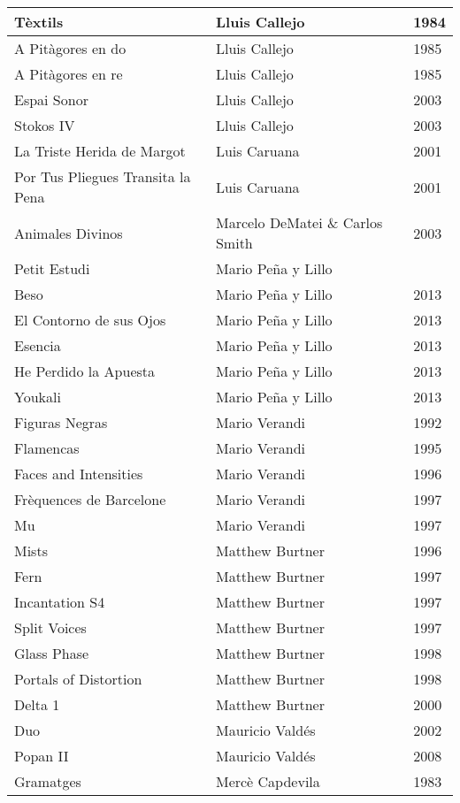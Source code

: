 \begin{center}
\begin{longtable}{ p{}  p{}  p{} }
Tèxtils & Lluis Callejo & 1984 \\ \midrule 
A Pitàgores en do & Lluis Callejo & 1985 \\ \midrule 
A Pitàgores en re & Lluis Callejo & 1985 \\ \midrule 
Espai Sonor & Lluis Callejo & 2003 \\ \midrule 
Stokos IV & Lluis Callejo & 2003 \\ \midrule 
La Triste Herida de Margot & Luis Caruana & 2001 \\ \midrule 
Por Tus Pliegues Transita la Pena & Luis Caruana & 2001 \\ \midrule 
Animales Divinos & Marcelo DeMatei \& Carlos Smith & 2003 \\ \midrule 
Petit Estudi & Mario Peña y Lillo &  \\ \midrule 
Beso & Mario Peña y Lillo & 2013 \\ \midrule 
El Contorno de sus Ojos & Mario Peña y Lillo & 2013 \\ \midrule 
Esencia & Mario Peña y Lillo & 2013 \\ \midrule 
He Perdido la Apuesta & Mario Peña y Lillo & 2013 \\ \midrule 
Youkali & Mario Peña y Lillo & 2013 \\ \midrule 
Figuras Negras & Mario Verandi & 1992 \\ \midrule 
Flamencas & Mario Verandi & 1995 \\ \midrule 
Faces and Intensities & Mario Verandi & 1996 \\ \midrule 
Frèquences de Barcelone & Mario Verandi & 1997 \\ \midrule 
Mu & Mario Verandi & 1997 \\ \midrule 
Mists & Matthew Burtner & 1996 \\ \midrule 
Fern & Matthew Burtner & 1997 \\ \midrule 
Incantation S4 & Matthew Burtner & 1997 \\ \midrule 
Split Voices & Matthew Burtner & 1997 \\ \midrule 
Glass Phase & Matthew Burtner & 1998 \\ \midrule 
Portals of Distortion & Matthew Burtner & 1998 \\ \midrule 
Delta 1 & Matthew Burtner & 2000 \\ \midrule 
Duo & Mauricio Valdés & 2002 \\ \midrule 
Popan II & Mauricio Valdés & 2008 \\ \midrule 
Gramatges & Mercè Capdevila & 1983 \\ \midrule 

\end{longtable}
\end{center}
